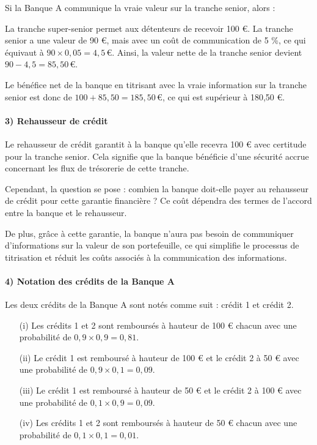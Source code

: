 \documentclass[a4paper, 12pt]{report}
\begin{document}
Si la Banque A communique la vraie valeur sur la tranche senior, alors :

La tranche super-senior permet aux détenteurs de recevoir 100 €. La tranche senior a une valeur de 90 €, mais avec un coût de communication de 5 \%, ce qui équivaut à \(90 \times 0,05 = 4,5 \, \text{€}\). Ainsi, la valeur nette de la tranche senior devient \(90 - 4,5 = 85,50 \, \text{€}\).

Le bénéfice net de la banque en titrisant avec la vraie information sur la tranche senior est donc de \(100 + 85,50 = 185,50 \, \text{€}\), ce qui est supérieur à 180,50 €.

\paragraph{3) Rehausseur de crédit}

Le rehausseur de crédit garantit à la banque qu'elle recevra 100 € avec certitude pour la tranche senior. Cela signifie que la banque bénéficie d'une sécurité accrue concernant les flux de trésorerie de cette tranche.

Cependant, la question se pose : combien la banque doit-elle payer au rehausseur de crédit pour cette garantie financière ? Ce coût dépendra des termes de l'accord entre la banque et le rehausseur.

De plus, grâce à cette garantie, la banque n'aura pas besoin de communiquer d'informations sur la valeur de son portefeuille, ce qui simplifie le processus de titrisation et réduit les coûts associés à la communication des informations.

\paragraph{4) Notation des crédits de la Banque A}

Les deux crédits de la Banque A sont notés comme suit : crédit 1 et crédit 2.

\begin{itemize}
\item[(i)] Les crédits 1 et 2 sont remboursés à hauteur de 100 € chacun avec une probabilité de \(0,9 \times 0,9 = 0,81\).
\item[(ii)] Le crédit 1 est remboursé à hauteur de 100 € et le crédit 2 à 50 € avec une probabilité de \(0,9 \times 0,1 = 0,09\).
\item[(iii)] Le crédit 1 est remboursé à hauteur de 50 € et le crédit 2 à 100 € avec une probabilité de \(0,1 \times 0,9 = 0,09\).
\item[(iv)] Les crédits 1 et 2 sont remboursés à hauteur de 50 € chacun avec une probabilité de \(0,1 \times 0,1 = 0,01\).
\end{itemize}
\end{document}
